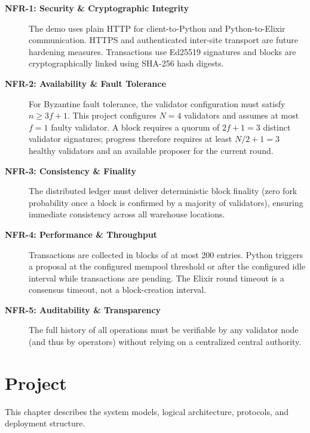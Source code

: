 \documentclass[11pt, a4paper, oneside]{memoir}
\begin{document}
\begin{description}
    \item[\textbf{NFR-1: Security \& Cryptographic Integrity}]
    The demo uses plain HTTP for client-to-Python and Python-to-Elixir
    communication. HTTPS and authenticated inter-site transport are future
    hardening measures. Transactions use Ed25519 signatures and blocks are
    cryptographically linked using SHA-256 hash digests.

    \item[\textbf{NFR-2: Availability \& Fault Tolerance}]
    For Byzantine fault tolerance, the validator configuration must satisfy $n \ge 3f + 1$. This project configures $N=4$ validators and assumes at most $f=1$ faulty validator. A block requires a quorum of $2f+1=3$ distinct validator signatures; progress therefore requires at least $N/2+1=3$ healthy validators and an available proposer for the current round.

    \item[\textbf{NFR-3: Consistency \& Finality}]
    The distributed ledger must deliver deterministic block finality (zero fork probability once a block is confirmed by a majority of validators), ensuring immediate consistency across all warehouse locations.

    \item[\textbf{NFR-4: Performance \& Throughput}]
    Transactions are collected in blocks of at most 200 entries. Python
    triggers a proposal at the configured mempool threshold or after the
    configured idle interval while transactions are pending. The Elixir round
    timeout is a consensus timeout, not a block-creation interval.

    \item[\textbf{NFR-5: Auditability \& Transparency}]
    The full history of all operations must be verifiable by any validator node (and thus by operators) without relying on a centralized central authority.
\end{description}

\chapter{Project}\label{ch:project}

This chapter describes the system models, logical architecture, protocols, and deployment structure.
\end{document}
